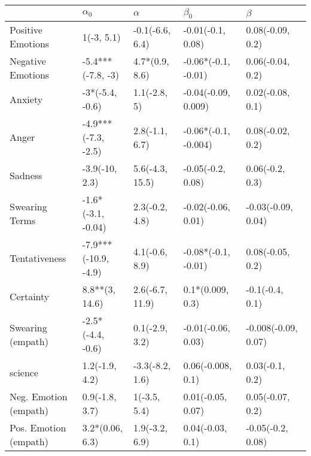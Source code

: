 \begin{tabular}{lllll}
\toprule
{} &            $\alpha_0$ &         $\alpha$ &             $\beta_0$ &              $\beta$ \\
\midrule
Positive Emotions     &            1(-3, 5.1) &  -0.1(-6.6, 6.4) &     -0.01(-0.1, 0.08) &     0.08(-0.09, 0.2) \\
Negative Emotions     &     -5.4***(-7.8, -3) &   4.7*(0.9, 8.6) &   -0.06*(-0.1, -0.01) &     0.06(-0.04, 0.2) \\
Anxiety               &       -3*(-5.4, -0.6) &     1.1(-2.8, 5) &   -0.04(-0.09, 0.009) &     0.02(-0.08, 0.1) \\
Anger                 &   -4.9***(-7.3, -2.5) &   2.8(-1.1, 6.7) &  -0.06*(-0.1, -0.004) &     0.08(-0.02, 0.2) \\
Sadness               &        -3.9(-10, 2.3) &  5.6(-4.3, 15.5) &     -0.05(-0.2, 0.08) &      0.06(-0.2, 0.3) \\
Swearing Terms        &    -1.6*(-3.1, -0.04) &   2.3(-0.2, 4.8) &    -0.02(-0.06, 0.01) &   -0.03(-0.09, 0.04) \\
Tentativeness         &  -7.9***(-10.9, -4.9) &   4.1(-0.6, 8.9) &   -0.08*(-0.1, -0.01) &     0.08(-0.05, 0.2) \\
Certainty             &        8.8**(3, 14.6) &  2.6(-6.7, 11.9) &      0.1*(0.009, 0.3) &      -0.1(-0.4, 0.1) \\
Swearing (empath)     &     -2.5*(-4.4, -0.6) &   0.1(-2.9, 3.2) &    -0.01(-0.06, 0.03) &  -0.008(-0.09, 0.07) \\
science               &        1.2(-1.9, 4.2) &  -3.3(-8.2, 1.6) &     0.06(-0.008, 0.1) &      0.03(-0.1, 0.2) \\
Neg. Emotion (empath) &        0.9(-1.8, 3.7) &     1(-3.5, 5.4) &     0.01(-0.05, 0.07) &     0.05(-0.07, 0.2) \\
Pos. Emotion (empath) &       3.2*(0.06, 6.3) &   1.9(-3.2, 6.9) &      0.04(-0.03, 0.1) &    -0.05(-0.2, 0.08) \\
\bottomrule
\end{tabular}
